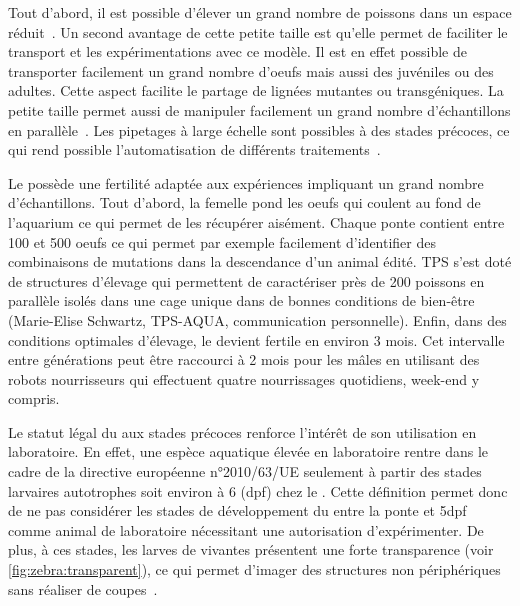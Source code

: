 \documentclass[\main/main.tex]{subfiles}
\begin{document}
%
Tout d'abord, il est possible d'élever un grand nombre de poissons dans un espace réduit~\cite{avdesh_2012}.
%
Un second avantage de cette petite taille est qu'elle permet de faciliter le transport et les expérimentations avec ce modèle.
%
Il est en effet possible de transporter facilement un grand nombre d'oeufs mais aussi des juvéniles ou des adultes.
%
Cette aspect facilite le partage de lignées mutantes ou transgéniques.
%
%
La petite taille permet aussi de manipuler facilement un grand nombre d'échantillons en parallèle~\cite{wittbrodt_2014,brion_2012}. Les pipetages à large échelle sont possibles à des stades précoces,
ce qui rend possible l'automatisation de différents traitements~\cite{mandrell_2012,teixid_2019}.

Le \pz{} possède une fertilité adaptée aux expériences impliquant un grand nombre d'échantillons.
%
Tout d'abord, la femelle pond les oeufs qui coulent au fond de l'aquarium ce  qui permet de les récupérer aisément. Chaque ponte contient entre 100 et 500 oeufs ce qui permet par exemple facilement d'identifier des combinaisons de mutations dans la descendance d'un animal édité. TPS s'est doté de structures d'élevage qui permettent de caractériser près de 200 poissons en parallèle isolés dans une cage unique dans de bonnes conditions de bien-être (Marie-Elise Schwartz, TPS-AQUA, communication personnelle).  
%
Enfin, dans des conditions optimales d'élevage, le \pz{} devient fertile en environ 3 mois. Cet intervalle entre générations peut être raccourci à 2 mois pour les mâles en utilisant des robots nourrisseurs qui effectuent quatre nourrissages quotidiens, week-end y compris. 


Le statut légal du \pz{} aux stades précoces renforce l'intérêt de son utilisation en laboratoire.
%
En effet, une espèce aquatique élevée en laboratoire rentre dans le cadre de la directive européenne n°2010/63/UE seulement à partir des stades larvaires autotrophes soit environ à 6 \dpf{} (dpf) chez le \pz{}.
%
Cette définition permet donc de ne pas considérer les stades de développement du \pz{} entre la ponte et 5dpf comme animal de laboratoire nécessitant une autorisation d'expérimenter.
%
%
De plus, à ces stades, les larves de \pzs{} vivantes présentent une forte transparence (voir \autoref{fig:zebra:transparent}),
ce qui permet d'imager des structures non périphériques sans réaliser de coupes~\cite{asokan_2020,chen_2020,hamilton_2016,kioka_2020}.
\end{document}
